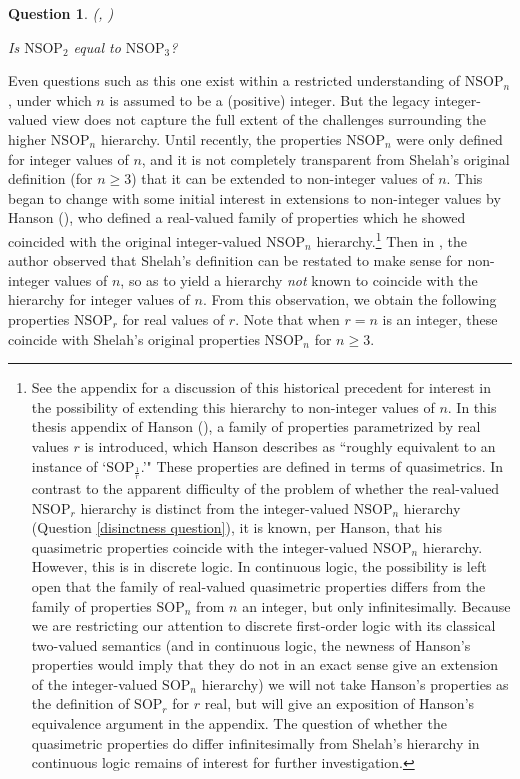 \documentclass{amsart}
\newtheorem{question}[theorem]{Question}
\theoremstyle{definition}
\theoremstyle{remark}
\numberwithin{equation}{section}
\begin{document}
\begin{question}\label{is nsop2 equal to nsop3}(\cite{DS04}, \cite{Sh99})


Is $\mathrm{NSOP}_{2}$ equal to $\mathrm{NSOP}_{3}$?

\end{question}

Even questions such as this one exist within a restricted understanding of $\mathrm{NSOP}_{n}$, under which $n$ is assumed to be a (positive) integer. But the legacy integer-valued view does not capture the full extent of the challenges surrounding the higher $\mathrm{NSOP}_{n}$ hierarchy. Until recently, the properties $\mathrm{NSOP}_{n}$ were only defined for integer values of $n$, and it is not completely transparent from Shelah's original definition (for $n\geq 3$) that it can be extended to non-integer values of $n$. This began to change with some initial interest in extensions to non-integer values by Hanson (\cite{Hanson2020}), who defined a real-valued family of properties which he showed coincided with the original integer-valued $\mathrm{NSOP}_n$ hierarchy.\footnote{See the appendix for a discussion of this historical precedent for interest in the possibility of extending this hierarchy to non-integer values of $n$. In this thesis appendix of Hanson (\cite{Hanson2020}), a family of properties parametrized by real values $r$ is introduced, which Hanson describes as ``roughly equivalent to an instance of `$\mathrm{SOP}_{\frac{1}{r}}$.'" These properties are defined in terms of quasimetrics. In contrast to the apparent difficulty of the problem of whether the real-valued $\mathrm{NSOP}_{r}$ hierarchy is distinct from the integer-valued $\mathrm{NSOP}_{n}$ hierarchy (Question \ref{disinctness question}), it is known, per Hanson, that his quasimetric properties coincide with the integer-valued $\mathrm{NSOP}_{n}$ hierarchy. However, this is in discrete logic. In continuous logic, the possibility is left open that the family of real-valued quasimetric properties differs from the family of properties $\mathrm{SOP}_{n}$ from $n$ an integer, but only infinitesimally. Because we are restricting our attention to discrete first-order logic with its classical two-valued semantics (and in continuous logic, the newness of Hanson's properties would imply that they do not in an exact sense give an extension of the integer-valued $\mathrm{SOP}_n$ hierarchy) we will not take Hanson's properties as the definition of $\mathrm{SOP}_{r}$ for $r$ real, but will give an exposition of Hanson's equivalence argument in the appendix. The question of whether the quasimetric properties do differ infinitesimally from Shelah's hierarchy in continuous logic remains of interest for further investigation.} Then in \cite{ApproxOrder}, the author observed that Shelah's definition can be restated to make sense for non-integer values of $n$, so as to yield a hierarchy \textit{not} known to coincide with the hierarchy for integer values of $n$. From this observation, we obtain the following properties $\mathrm{NSOP}_{r}$ for real values of $r$. Note that when $r = n$ is an integer, these coincide with Shelah's original properties $\mathrm{NSOP}_{n}$ for $n \geq 3$.
\end{document}
